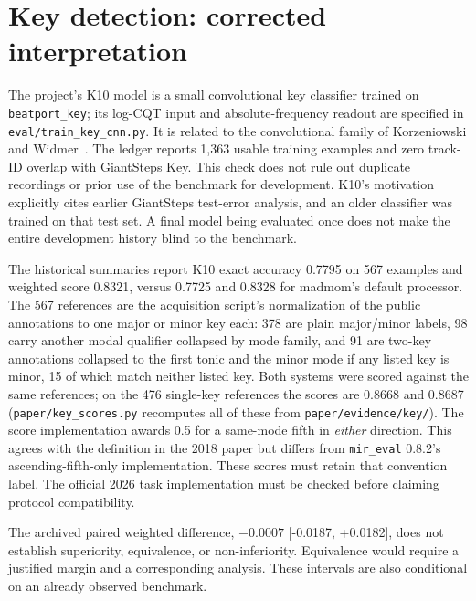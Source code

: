 \documentclass[11pt]{article}
\newcommand{\ci}[2]{{\small[#1, #2]}}
\begin{document}
\section{Key detection: corrected interpretation}
\label{app:key}
The project's K10 model is a small convolutional key classifier trained on
\texttt{beatport\_key}; its log-CQT input and absolute-frequency readout are
specified in \texttt{eval/train\_key\_cnn.py}. It is related to the convolutional
family of Korzeniowski and Widmer~\citep{korzeniowski2018genre}. The ledger reports
1,363 usable training examples and zero track-ID overlap with GiantSteps Key.
This check does not rule out duplicate recordings or prior use of the benchmark
for development. K10's motivation explicitly cites earlier GiantSteps test-error
analysis, and an older classifier was trained on that test set. A final model
being evaluated once does not make the entire development history blind to the
benchmark.

The historical summaries report K10 exact accuracy 0.7795 on 567 examples and
weighted score 0.8321, versus 0.7725 and 0.8328 for madmom's default processor.
The 567 references are the acquisition script's normalization of the public
annotations to one major or minor key each: 378 are plain major/minor labels, 98
carry another modal qualifier collapsed by mode family, and 91 are two-key
annotations collapsed to the first tonic and the minor mode if any listed key is
minor, 15 of which match neither listed key. Both systems were scored against the
same references; on the 476 single-key references the scores are 0.8668 and
0.8687 (\texttt{paper/key\_scores.py} recomputes all of these from
\texttt{paper/evidence/key/}).
The score implementation awards 0.5 for a same-mode fifth in \emph{either}
direction. This agrees with the definition in the 2018 paper but differs from
\texttt{mir\_eval} 0.8.2's ascending-fifth-only implementation. These scores must
retain that convention label. The official 2026 task implementation must be
checked before claiming protocol compatibility.

The archived paired weighted difference, $-0.0007$ \ci{-0.0187}{+0.0182},
does not establish superiority, equivalence, or non-inferiority. Equivalence would
require a justified margin and a corresponding analysis. These intervals are also
conditional on an already observed benchmark.
\end{document}
